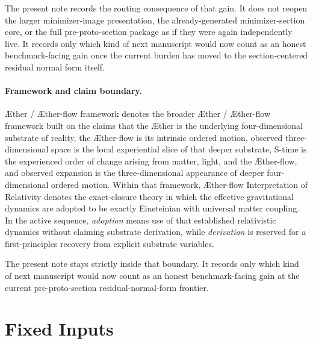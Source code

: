 \documentclass[11pt]{article}
\newcommand{\Aether}{\AE{}ther}
\newcommand{\Aflow}{\AE{}ther-flow}
\newcommand{\TheoryName}{\Aflow{} Interpretation of Relativity}
\newcommand{\TheoryProgram}{\Aether{} / \Aflow{} framework}
\begin{document}
The present note records the routing consequence of that gain. It does not reopen the larger minimizer-image presentation, the already-generated minimizer-section core, or the full pre-proto-section package as if they were again independently live. It records only which kind of next manuscript would now count as an honest benchmark-facing gain once the current burden has moved to the section-centered residual normal form itself.

\paragraph{Framework and claim boundary.}
\TheoryProgram{} denotes the broader \Aether{} / \Aflow{} framework built on the claims that the \Aether{} is the underlying four-dimensional substrate of reality, the \Aflow{} is its intrinsic ordered motion, observed three-dimensional space is the local experiential slice of that deeper substrate, S-time is the experienced order of change arising from matter, light, and the \Aflow{}, and observed expansion is the three-dimensional appearance of deeper four-dimensional ordered motion. Within that framework, \TheoryName{} denotes the exact-closure theory in which the effective gravitational dynamics are adopted to be exactly Einsteinian with universal matter coupling. In the active sequence, \emph{adoption} means use of that established relativistic dynamics without claiming substrate derivation, while \emph{derivation} is reserved for a first-principles recovery from explicit substrate variables.

The present note stays strictly inside that boundary. It records only which kind of next manuscript would now count as an honest benchmark-facing gain at the current pre-proto-section residual-normal-form frontier.

\section{Fixed Inputs}
\end{document}
